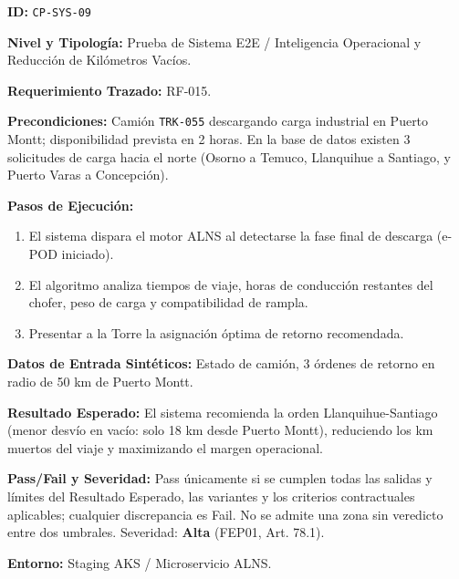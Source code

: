 \par\noindent\textbf{ID:} \texttt{C\allowbreak{}P\allowbreak{}-\allowbreak{}S\allowbreak{}Y\allowbreak{}S\allowbreak{}-\allowbreak{}0\allowbreak{}9\allowbreak{}}\par
\par\noindent\textbf{Nivel y Tipología:} Prueba de Sistema E2E / Inteligencia Operacional y Reducción de Kilómetros Vacíos.\par
\par\noindent\textbf{Requerimiento Trazado:} RF-015.\par
\par\noindent\textbf{Precondiciones:} Camión \texttt{T\allowbreak{}R\allowbreak{}K\allowbreak{}-\allowbreak{}0\allowbreak{}5\allowbreak{}5\allowbreak{}} descargando carga industrial en Puerto Montt; disponibilidad prevista en 2 horas. En la base de datos existen 3 solicitudes de carga hacia el norte (Osorno a Temuco, Llanquihue a Santiago, y Puerto Varas a Concepción).\par
\par\noindent\textbf{Pasos de Ejecución:} \par
\begin{enumerate}
\item El sistema dispara el motor ALNS al detectarse la fase final de descarga (e-POD iniciado).
\item El algoritmo analiza tiempos de viaje, horas de conducción restantes del chofer, peso de carga y compatibilidad de rampla.
\item Presentar a la Torre la asignación óptima de retorno recomendada.
\end{enumerate}
\par\noindent\textbf{Datos de Entrada Sintéticos:} Estado de camión, 3 órdenes de retorno en radio de 50 km de Puerto Montt.\par
\par\noindent\textbf{Resultado Esperado:} El sistema recomienda la orden Llanquihue-Santiago (menor desvío en vacío: solo 18 km desde Puerto Montt), reduciendo los km muertos del viaje y maximizando el margen operacional.\par
\par\noindent\textbf{Pass/Fail y Severidad:} Pass únicamente si se cumplen todas las salidas y límites del Resultado Esperado, las variantes y los criterios contractuales aplicables; cualquier discrepancia es Fail. No se admite una zona sin veredicto entre dos umbrales. Severidad: \textbf{Alta} (FEP01, Art. 78.1).\par
\par\noindent\textbf{Entorno:} Staging AKS / Microservicio ALNS.\par







